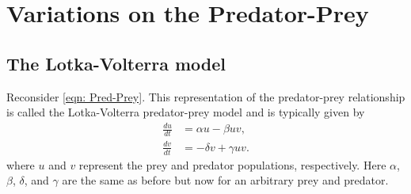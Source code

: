 \section*{Variations on the Predator-Prey}
\subsection*{The Lotka-Volterra model}
Reconsider \eqref{eqn: Pred-Prey}. This representation of the predator-prey relationship is called the Lotka-Volterra predator-prey model and is typically given by %
\begin{align*}
	\frac{du}{dt} &= \alpha u - \beta uv,\\
	\frac{dv}{dt} &= -\delta v + \gamma uv.
\end{align*}
where $u$ and $v$ represent the prey and predator populations, respectively. Here $\alpha$, $\beta$, $\delta$, and $\gamma$ are the same as before but now for an arbitrary prey and predator.%

